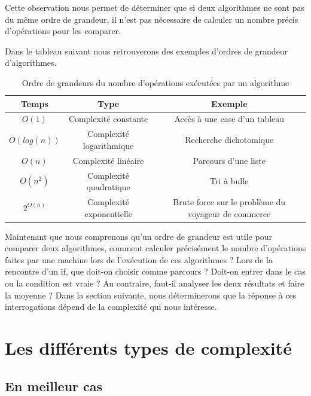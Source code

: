 \documentclass[12pt, twoside, openright]{report}
\begin{document}
Cette observation nous permet de déterminer que si deux algorithmes ne sont pas du même ordre de grandeur, il n'est pas nécessaire de calculer un nombre précis d'opérations pour les comparer.

Dans le tableau suivant nous retrouverons des exemples d'ordres de grandeur d'algorithmes.  \cite{moore02} 
\begin{center}
    \begin{table}
        \begin{tabular}{|c|c|c|}
            \hline 
    Temps & Type & Exemple \\ 
            \hline 
    $O(1)$        &Complexité constante&  Accès à une case d'un tableau\\ 
            \hline 
    $O(log(n))$       & Complexité logarithmique  & Recherche dichotomique \\ 
            \hline 
    $O(n)$        & Complexité linéaire & Parcours d'une liste \\ 
            \hline 
    $O(n^{2})$        & Complexité quadratique  & Tri à bulle \\ 
            \hline 
    $2^{O(n)}$ & Complexité exponentielle & Brute force sur le problème du voyageur de commerce \\
            \hline
        \end{tabular}
    \caption{\label{table:complexite}Ordre de grandeurs du nombre d'opérations exécutées par un algorithme}
    \end{table}
\end{center}

Maintenant que nous comprenons qu'un ordre de grandeur est utile pour comparer deux algorithmes, comment calculer précisément le nombre d'opérations faites par une machine lors de l'exécution de ces algorithmes ? Lors de la rencontre d'un if, que doit-on choisir comme parcours ? Doit-on entrer dans le cas ou la condition est vraie ? Au contraire, faut-il analyser les deux résultats et faire la moyenne ? Dans la section suivante, nous déterminerons que la réponse à ces interrogations dépend de la complexité qui nous intéresse.

\section{Les différents types de complexité}

\subsection{En meilleur cas}
\end{document}
